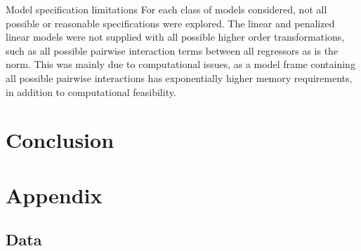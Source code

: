 \documentclass[a4paper, table]{article}
\begin{document}
Model specification limitations
For each class of models considered, not all possible or reasonable specifications were explored. The linear and penalized linear models were not supplied with all possible higher order transformations, such as all possible pairwise interaction terms between all regressors as is the norm. This was mainly due to computational issues, as a model frame containing all possible pairwise interactions has exponentially higher memory requirements, in addition to computational feasibility. 

\section{Conclusion}



\section{Appendix}

\subsection{Data}
\end{document}

